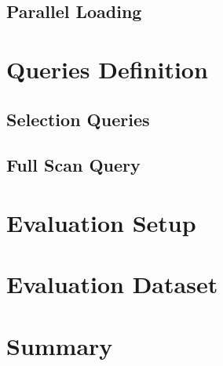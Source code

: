 {\subsection{Parallel Loading}


\section{Queries Definition}
\label{qryDef}
\subsection{Selection Queries}
\subsection{Full Scan Query}


\section{Evaluation Setup}
\label{evalEnv}


\section{Evaluation Dataset}
\label{dataset}


\section{Summary}
\label{summary}

}